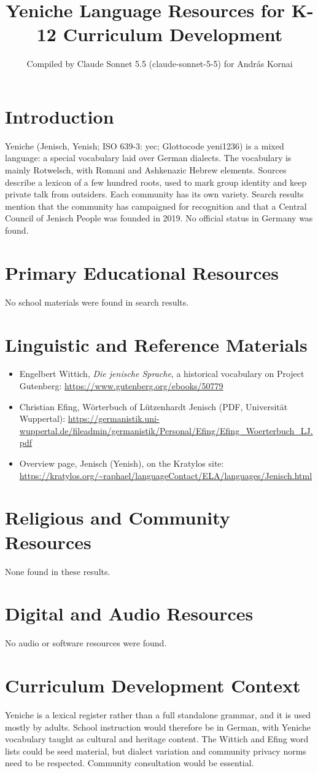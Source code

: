 \documentclass[12pt]{article}
\title{Yeniche Language Resources for K-12 Curriculum Development}
\author{Compiled by Claude Sonnet 5.5 (claude-sonnet-5-5) for Andr\'as Kornai}
\date{}
\begin{document}
\maketitle

\section{Introduction}
Yeniche (Jenisch, Yenish; ISO 639-3: yec; Glottocode yeni1236) is a mixed language: a special vocabulary laid over German dialects. The vocabulary is mainly Rotwelsch, with Romani and Ashkenazic Hebrew elements. Sources describe a lexicon of a few hundred roots, used to mark group identity and keep private talk from outsiders. Each community has its own variety. Search results mention that the community has campaigned for recognition and that a Central Council of Jenisch People was founded in 2019. No official status in Germany was found.

\section{Primary Educational Resources}
No school materials were found in search results.

\section{Linguistic and Reference Materials}
\begin{itemize}
\item Engelbert Wittich, \emph{Die jenische Sprache}, a historical vocabulary on Project Gutenberg: \url{https://www.gutenberg.org/ebooks/50779}
\item Christian Efing, Wörterbuch of Lützenhardt Jenisch (PDF, Universität Wuppertal): \url{https://germanistik.uni-wuppertal.de/fileadmin/germanistik/Personal/Efing/Efing_Woerterbuch_LJ.pdf}
\item Overview page, Jenisch (Yenish), on the Kratylos site: \url{https://kratylos.org/~raphael/languageContact/ELA/languages/Jenisch.html}
\end{itemize}

\section{Religious and Community Resources}
None found in these results.

\section{Digital and Audio Resources}
No audio or software resources were found.

\section{Curriculum Development Context}
Yeniche is a lexical register rather than a full standalone grammar, and it is used mostly by adults. School instruction would therefore be in German, with Yeniche vocabulary taught as cultural and heritage content. The Wittich and Efing word lists could be seed material, but dialect variation and community privacy norms need to be respected. Community consultation would be essential.
\end{document}
